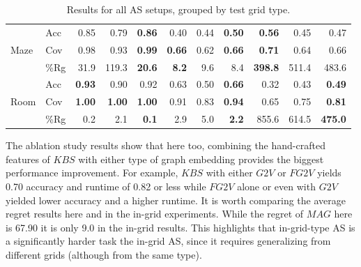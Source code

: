 \documentclass[letterpaper]{article} %
\newcommand{\gtv}[1]{\ensuremath{\textit{G2V}}\xspace}
\newcommand{\fgtv}[1]{\ensuremath{\textit{FG2V}}\xspace}
\newcommand{\kaduri}[1]{\ensuremath{\textit{KBS}}\xspace}
\newcommand{\mapfgas}[1]{\ensuremath{\textit{MAG}}\xspace}
\begin{document}
\begin{table}[bthp]
\begin{tabular}{@{}ll|rrr|rrr|rrr@{}}
\midrule
\multirow{3}{*}{Maze}      & Acc      & 0.85                    & 0.79                    & \textbf{0.86}           & 0.40                    & 0.44                    & \textbf{0.50}           & \textbf{0.56}           & 0.45                    & 0.47                    \\
                           & Cov      & 0.98                    & 0.93                    & \textbf{0.99}           & \textbf{0.66}           & 0.62                    & \textbf{0.66}           & \textbf{0.71}           & 0.64                    & 0.66                    \\
                           & \%Rg     & 31.9                    & 119.3                   & \textbf{20.6}           & \textbf{8.2}            & 9.6                     & 8.4                     & \textbf{398.8}          & 511.4                   & 483.6                   \\
\midrule
\multirow{3}{*}{Room}      & Acc      & \textbf{0.93}           & 0.90                    & 0.92                    & 0.63                    & 0.50                    & \textbf{0.66}           & 0.32                    & 0.43                    & \textbf{0.49}           \\
                           & Cov      & \textbf{1.00}           & \textbf{1.00}           & \textbf{1.00}           & 0.91                    & 0.83                    & \textbf{0.94}           & 0.65                    & 0.75                    & \textbf{0.81}           \\
                           & \%Rg     & 0.2                     & 2.1                     & \textbf{0.1}            & 2.9                     & 5.0                     & \textbf{2.2}            & 855.6                   & 614.5                   & \textbf{475.0}          \\ \bottomrule
\end{tabular}
\caption{Results for all AS setups, grouped by test grid type.}
\label{tab:by-grid-type}
\end{table}


The ablation study results show that here too, combining the hand-crafted features of \kaduri\ with either type of graph embedding provides the biggest performance improvement. For example, \kaduri\ with either \gtv\ or \fgtv\ yields 0.70 accuracy and runtime of 0.82 or less while \fgtv\ alone or even with \gtv\ yielded lower accuracy and a higher runtime. It is worth comparing the average regret results here and in the in-grid experiments. While the regret of \mapfgas\ here is 67.90 it is only 9.0 in the in-grid results. This highlights that in-grid-type AS is a significantly harder task the in-grid AS, since it requires generalizing from different grids (although from the same type).
\end{document}
